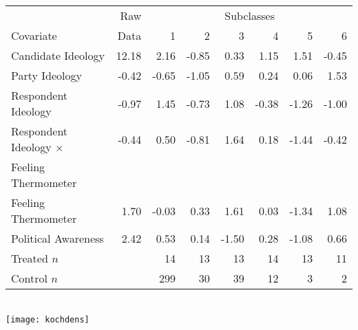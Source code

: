 \documentclass[20pt,landscape,pdftex]{foils}
\newcommand{\MC}{\multicolumn}
\begin{document}


\hypersetup{pdfpagetransition=Replace}

\begin{center}
    \begin{tabular}{lrrrrrrr}
      \hline
      & Raw  &\MC{6}{c}{ Subclasses} \\
      Covariate & Data  & 1 &  2 &  3 &  4 &  5 &  6 \\
      \hline
      Candidate Ideology & 12.18 & 2.16 & -0.85 & 0.33 & 1.15 & 1.51 & -0.45 \\
      Party Ideology & -0.42 & -0.65 & -1.05 & 0.59 & 0.24 & 0.06 & 1.53 \\
      Respondent Ideology & -0.97 & 1.45 & -0.73 & 1.08 & -0.38 & -1.26 & -1.00 \\
      Respondent Ideology $\times$ & -0.44 & 0.50 & -0.81 & 1.64 & 0.18 &
      -1.44 & -0.42 \\
      \hspace{0.1in} Feeling Thermometer \\
      Feeling Thermometer & 1.70 & -0.03 & 0.33 & 1.61 & 0.03 & -1.34 & 1.08 \\
      Political Awareness & 2.42 & 0.53 & 0.14 & -1.50 & 0.28 & -1.08 & 0.66
      \\ \hline
      Treated $n$& & 14 & 13 & 13 & 14 & 13 & 11 \\
      Control $n$& & 299 & 30 & 39 & 12 & 3 & 2 \\
      \hline
    \end{tabular} \\
  \texttt{[image: kochdens]}\pause
\end{center}
\end{document}
